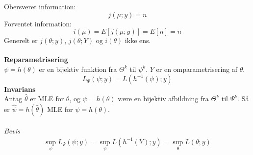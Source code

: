 \documentclass[12pt,a4paper]{report}
\begin{document}
Obersveret information:
\begin{equation}
j(\mu;y)=n
\end{equation}
Forventet information:
\begin{equation}
i(\mu)=E\left[j(\mu;y)\right]=E[n]=n
\end{equation}
Generelt er $j(\theta;y)$, $j(\theta;Y)$ og $i(\theta)$ ikke ens.\\\\
\textbf{Reparametrisering}\\
$\psi=h(\theta)$ er en bijektiv funktion fra $\Theta^k$ til $\psi^k$. $Y$ er en omparametrisering af $\theta$.
\begin{equation}
L_{\Psi}(\psi;y)=L(h^{-1}(\psi);y)
\end{equation}
\textbf{Invarians}\\
Antag $\hat{\theta}$ er MLE for $\theta$, og $\psi=h(\theta)$ være en bijektiv afbildning fra $\Theta^k$ til $\Psi^k$. Så er $\hat{\psi}=h(\hat{\theta})$ MLE for $\psi=h(\theta)$.\\\\
\textit{Bevis}\\
\begin{align*}
\sup_{\psi}L_{\Psi}(\psi;y)=\sup_{\psi}L(h^{-1}(Y);y)=\sup_{\theta}L(\theta;y)
\end{align*}
\end{document}
